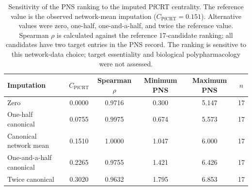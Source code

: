 \begin{table}[htbp]
\centering
\caption{Sensitivity of the PNS ranking to the imputed PfCRT centrality. The reference value is the observed network-mean imputation ($C_{\mathrm{PfCRT}}=\num{0.151}$). Alternative values were zero, one-half, one-and-a-half, and twice the reference value. Spearman $\rho$ is calculated against the reference 17-candidate ranking; all candidates have two target entries in the PNS record. The ranking is sensitive to this network-data choice; target essentiality and biological polypharmacology were not assessed.}
\label{tab:s7_pns_sensitivity}
\scriptsize
\begin{tabular}{l S[table-format=1.4] S[table-format=1.4] S[table-format=1.3] S[table-format=1.3] S[table-format=2.0]}
\toprule
Imputation & {$C_{\mathrm{PfCRT}}$} & {Spearman $\rho$} & {Minimum PNS} & {Maximum PNS} & {$n$} \\
\midrule
Zero & 0.0000 & 0.9716 & 0.300 & 5.147 & 17 \\
One-half canonical & 0.0755 & 0.9975 & 0.674 & 5.573 & 17 \\
Canonical network mean & 0.1510 & 1.0000 & 1.047 & 6.000 & 17 \\
One-and-a-half canonical & 0.2265 & 0.9755 & 1.421 & 6.426 & 17 \\
Twice canonical & 0.3020 & 0.9632 & 1.795 & 6.853 & 17 \\
\bottomrule
\end{tabular}
\end{table}
